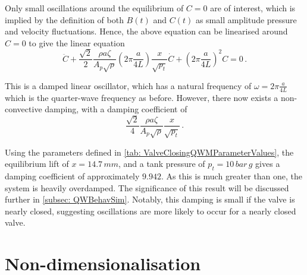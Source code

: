 Only small oscillations around the equilibrium of $C = 0$ are of interest, which is implied by the definition of both $B(t)$ and $C(t)$ as small amplitude pressure and velocity fluctuations. Hence, the above equation can be linearised around $C = 0$ to give the linear equation
~
\begin{equation} \label{eq: QWMBehaviourTheory}
    \ddot{C} + \frac{\sqrt{2}}{2} \frac{\rho a \zeta}{A_p \sqrt{\rho}} \left( 2 \pi \frac{a}{4 L} \right) \frac{x}{\sqrt{p_t}} \dot{C} +
    \left( 2 \pi \frac{a}{4 L} \right)^2 C = 0 \, .
\end{equation}

This is a damped linear oscillator, which has a natural frequency of $\omega = 2 \pi \frac{a}{4 L}$ which is the quarter-wave frequency as before. However, there now exists a non-convective damping, with a damping coefficient of
~
\begin{equation*}
    \frac{\sqrt{2}}{4} \frac{\rho a \zeta}{A_p \sqrt{\rho}} \frac{x}{\sqrt{p_t}} \, .
\end{equation*}

Using the parameters defined in \cref{tab: ValveClosingQWMParameterValues}, the equilibrium lift of $x = 14.7 \, \si{mm}$, and a tank pressure of $p_t = 10 \, \si{bar \, g}$ gives a damping coefficient of approximately $9.942$. As this is much greater than one, the system is heavily overdamped. The significance of this result will be discussed further in \cref{subsec: QWBehavSim}. Notably, this damping is small if the valve is nearly closed, suggesting oscillations are more likely to occur for a nearly closed valve.

\section{Non-dimensionalisation} \label{subsec: QWMNonDim}

